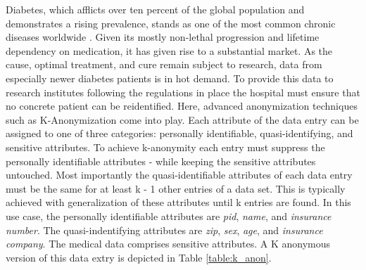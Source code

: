 Diabetes, which afflicts over ten percent of the global population and demonstrates a rising prevalence, stands as one of the most common chronic diseases worldwide \cite{idf2023, WHODiabetes2023}. Given its mostly non-lethal progression and lifetime dependency on medication, 
it has given rise to a substantial market. As the cause, optimal treatment, and cure remain subject to research, data from especially newer diabetes patients is in hot demand. To provide this data to research institutes following the regulations in place the hospital must ensure that no concrete patient can be reidentified. 
Here, advanced anonymization techniques such as K-Anonymization come into play. Each attribute of the data entry can be assigned to one of three categories: personally identifiable, quasi-identifying, and sensitive attributes. To achieve k-anonymity each entry must suppress the personally identifiable attributes - while keeping the sensitive attributes untouched. 
Most importantly the quasi-identifiable attributes of each data entry must be the same for at least k - 1 other entries of a data set. This is typically achieved with generalization of these attributes until k entries are found. In this use case, the personally identifiable attributes are \textit{pid}, \textit{name}, and \textit{insurance number}. 
The quasi-indentifying attributes are \textit{zip}, \textit{sex}, \textit{age}, and \textit{insurance company}. The medical data comprises sensitive attributes. A K anonymous version of this data extry is depicted in Table \ref{table:k_anon}. 

\bigskip

